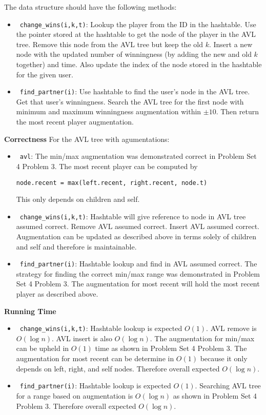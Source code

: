 \documentclass[12pt,twoside]{article}
\begin{document}
\begin{problems}
The data structure should have the following methods:
\begin{itemize}
  \item\ {\tt change\_wins(i,k,t)}: Lookup the player from the ID in the
  hashtable. Use the pointer stored at the hashtable to get the node of the
  player in the AVL tree. Remove this node from the AVL tree but keep the old
  $k$. Insert a new node with the updated number of winningness (by adding
  the new and old $k$ together) and time. Also update the index of the node
  stored in the hashtable for the given user.
  \item\ {\tt find\_partner(i)}: Use hashtable to find the user's node in the
  AVL tree. Get that user's winningness. Search the AVL tree for the first
  node with minimum and maximum winningness augmentation within $\pm 10$.
  Then return the most recent player augmentation.
\end{itemize}

{\bf Correctness} For the AVL tree with agumentations:
\begin{itemize}
  \item\ {\tt avl}: The min/max augmentation was demonstrated correct in
  Problem Set 4 Problem 3. The most recent player can be computed by
  \begin{center}
    {\tt node.recent = max(left.recent, right.recent, node.t)}
  \end{center}
  This only depends on children and self.
\end{itemize}

\begin{itemize}
  \item\ {\tt change\_wins(i,k,t)}: Hashtable will give reference to node in
  AVL tree assumed correct. Remove AVL assumed correct. Insert AVL assumed
  correct. Augmentation can be updated as described above in terms solely of
  children and self and therefore is maintainable.
  \item\ {\tt find\_partner(i)}: Hashtable lookup and find in AVL assumed
  correct. The strategy for finding the correct min/max range was
  demonstrated in Problem Set 4 Problem 3. The augmentation for most recent
  will hold the most recent player as described above.
\end{itemize}

{\bf Running Time}
\begin{itemize}
  \item\ {\tt change\_wins(i,k,t)}: Hashtable lookup is expected $O(1)$. AVL
  remove is $O(\log n)$. AVL insert is also $O(\log n)$. The augmentation for
  min/max can be upheld in $O(1)$ time as shown in Problem Set 4 Problem 3.
  The augmentation for most recent can be determine in $O(1)$ because it only
  depends on left, right, and self nodes. Therefore overall expected $O(\log
  n)$.
  \item\ {\tt find\_partner(i)}: Hashtable lookup is expected $O(1)$.
  Searching AVL tree for a range based on augmentation is $O(\log n)$ as
  shown in Problem Set 4 Problem 3. Therefore overall expected $O(\log n)$.
\end{itemize}


\end{problems}
\end{document}
